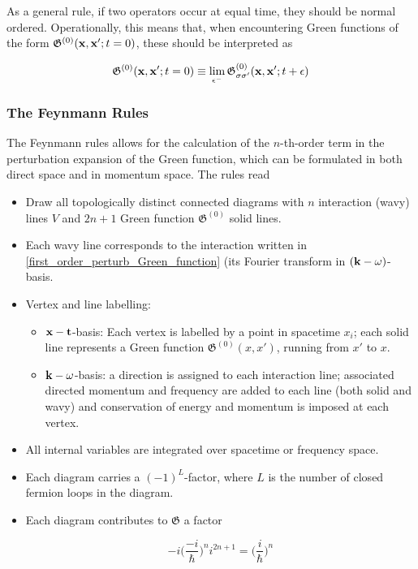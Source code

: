 \documentclass{homework}
\begin{document}
As a general rule, if two operators occur at equal time, they should be normal ordered. Operationally, this means that, when encountering Green functions of the form $\mathfrak{G}^{(0)}({\bf x}, {\bf x}'; t = 0)$, these should be interpreted as 

\begin{equation}
    \mathfrak{G}^{(0)}({\bf x}, {\bf x}'; t = 0) \equiv \lim_{\epsilon^{-}} \mathfrak{G}_{\sigma \sigma'}^{(0)}({\bf x}, {\bf x}'; t + \epsilon)
\end{equation}

\subsubsection{The Feynmann Rules}

The Feynmann rules allows for the calculation of the $n$-th-order term in the perturbation expansion of the Green function, which can be formulated in both direct space and in momentum space. The rules read

\begin{itemize}
    \item Draw all topologically distinct connected diagrams with $n$ interaction (wavy) lines $V$ and $2n+1$ Green function $\mathfrak{G}^{(0)}$ solid lines. 
    \item Each wavy line corresponds to the interaction written in \cref{first_order_perturb_Green_function} (its Fourier transform in $({\bf k}-\omega)$-basis.
    \item Vertex and line labelling: 
    \begin{itemize}
        \item ${\bf x -t}$-basis: Each vertex is labelled by a point in spacetime $x_i$; each solid line represents a Green function $\mathfrak{G}^{(0)}(x,x')$, running from $x'$ to $x$.
        \item ${\bf k}-\omega$-basis: a direction is assigned to each interaction line; associated directed momentum and frequency are added to each line (both solid and wavy) and conservation of energy and momentum is imposed at each vertex. 
    \end{itemize}
    \item All internal variables are integrated over spacetime or frequency space. 
    \item Each diagram carries a $(-1)^L$-factor, where $L$ is the number of closed fermion loops in the diagram.
    \item Each diagram contributes to $\mathfrak{G}$ a factor 

    $$
        -i \bigg(\frac{-i}{\hbar}\bigg)^n i^{2n+1} = \bigg(\frac{i}{\hbar}\bigg)^n 
    $$
\end{itemize}
\end{document}

